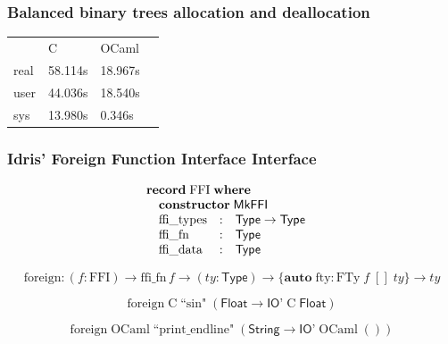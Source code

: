 \documentclass[aspectratio=169]{beamer}
\begin{document}
\begin{frame}
  \frametitle{Balanced binary trees allocation and deallocation}
  \centering
  \begin{tabular}{llll}\label{tab:bintreetab}
         & C       & OCaml   & \\
    real & 58.114s & 18.967s & \\
    user & 44.036s & 18.540s & \\
    sys  & 13.980s & 0.346s  &
  \end{tabular}
\end{frame}


\begin{frame}[t]
  \frametitle{Idris' Foreign Function Interface Interface}

  \begin{displaymath}
    \begin{array}{@{}l}
      \textbf{record}\;\mathrm{FFI}\;\textbf{where} \\
      \quad \textbf{constructor}\;\textsf{MkFFI} \\
      \quad
      \begin{array}{@{}lcl}
        \mathrm{ffi\_types}&:&\textsf{Type} \to \textsf{Type} \\
        \mathrm{ffi\_fn}&:&\textsf{Type} \\
        \mathrm{ffi\_data}&:&\textsf{Type}
      \end{array}
    \end{array}
  \end{displaymath}

  \bigskip
  \pause

  \begin{displaymath}
    \mathrm{foreign} : (f : \mathrm{FFI}) \to \mathrm{ffi\_fn}\,f \to (\mathit{ty} : \textsf{Type}) \to \{\textbf{auto}\;\mathrm{fty} : \mathrm{FTy}\;f\;[]\;\mathit{ty}\} \to \mathit{ty}
  \end{displaymath}

  \bigskip
  \pause

  \begin{displaymath}
    \mathrm{foreign}\;\mathrm{C}\;\textrm{``sin"}\;(\textsf{Float} \to \textsf{IO'}\;\mathrm{C}\;\textsf{Float})
  \end{displaymath}

  \pause

  \begin{displaymath}
    \mathrm{foreign}\;\mathrm{OCaml}\;\textrm{``print\_endline"}\;(\textsf{String} \to \textsf{IO'}\;\mathrm{OCaml}\;())
  \end{displaymath}
\end{frame}
\end{document}
